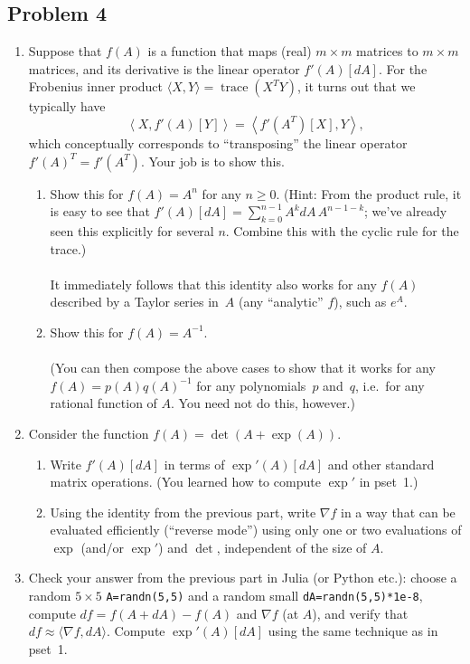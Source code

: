 \documentclass[10pt,oneside]{article}
\newcommand{\tr}{\operatorname{trace}}
\begin{document}
\subsection*{Problem 4}
\begin{enumerate}
\item Suppose that $f(A)$ is a function that maps (real) $m\times m$ matrices
to $m\times m$ matrices, and its derivative is the linear operator
$f'(A)[dA]$. For the Frobenius inner product $\langle X,Y\rangle=\tr(X^{T}Y)$,
it turns out that we typically have 
\[
\left\langle X,f'(A)[Y]\right\rangle =\left\langle f'(A^{T})[X],Y\right\rangle ,
\]
which conceptually corresponds to “transposing” the linear operator
$f'(A)^{T}=f'(A^{T})$. Your job is to show this.
\begin{enumerate}
\item Show this for $f(A)=A^{n}$ for any $n\ge0$. (Hint: From the product
rule, it is easy to see that $f'(A)[dA]=\sum_{k=0}^{n-1}A^{k}dA\,A^{n-1-k}$;
we've already seen this explicitly for several $n$. Combine this
with the cyclic rule for the trace.)\\
\\
It immediately follows that this identity also works for any $f(A)$
described by a Taylor series in~$A$ (any ``analytic'' $f$), such
as $e^{A}$.
\item Show this for $f(A)=A^{-1}$.\\
\\
(You can then compose the above cases to show that it works for any
$f(A)=p(A)q(A)^{-1}$ for any polynomials~$p$ and~$q$, i.e.~for
any rational function of $A$. You need not do this, however.)
\end{enumerate}
\item Consider the function $f(A)=\det(A + \exp(A))$.
\begin{enumerate}
\item Write $f'(A)[dA]$ in terms of $\exp'(A)[dA]$ and other standard matrix operations. (You learned how to
compute $\exp'$ in pset~1.)
\item Using the identity from the previous part, write $\nabla f$ in a
way that can be evaluated efficiently (“reverse mode”) using
only one or two evaluations of $\exp$ (and/or $\exp'$) and $\det$,
independent of the size of $A$.
\end{enumerate}
\item Check your answer from the previous part in Julia (or Python etc.):
choose a random $5\times5$ \texttt{A=randn(5,5)} and a random small
\texttt{dA=randn(5,5){*}1e-8}, compute $df=f(A+dA)-f(A)$ and $\nabla f$
(at $A$), and verify that $df\approx\langle\nabla f,dA\rangle$.
Compute $\exp'(A)[dA]$ using the same technique as in pset~1.
\end{enumerate}
\end{document}
